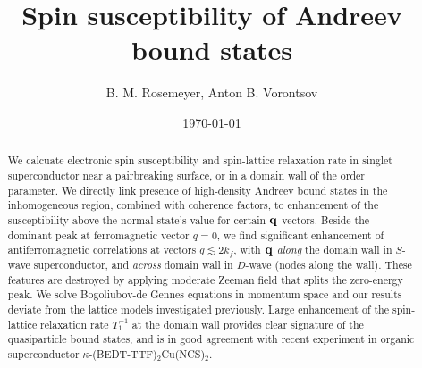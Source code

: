 \documentclass[prb,aps,showpacs,amsmath,twocolumn,10pt]{revtex4-1}
\newcommand{\kbtf}{$\kappa$-(BEDT-TTF)$_2$Cu(NCS)$_2$}
\begin{document}
\title{Spin susceptibility of Andreev bound states} 

\author{B. M. Rosemeyer, Anton B. Vorontsov}

\date{\today}

\begin{abstract}
%
We calcuate electronic spin susceptibility and spin-lattice relaxation rate 
in singlet superconductor near a pairbreaking surface, or in a domain wall of the order parameter. 
We directly link presence of high-density Andreev bound states in the inhomogeneous region, combined with coherence factors, 
to enhancement of the susceptibility above the normal state's value for certain ${\bf q}$ vectors.  
Beside the dominant peak at ferromagnetic vector $q=0$, we find significant enhancement of 
antiferromagnetic correlations at vectors $q\lesssim 2 k_f$, 
with ${\bf q}$ \emph{along} the domain wall in $S$-wave superconductor, and \emph{across} domain wall in $D$-wave (nodes along the wall).  
These features are destroyed by applying moderate Zeeman field that splits the zero-energy peak. 
We solve Bogoliubov-de Gennes equations in momentum space and 
our results deviate from the lattice models investigated previously. 
Large enhancement of the spin-lattice relaxation rate $T_1^{-1}$ at the domain wall 
provides clear signature of the quasiparticle bound states, 
and is in good agreement with recent experiment in organic superconductor \kbtf. 
\end{abstract} 


\maketitle
\end{document}
